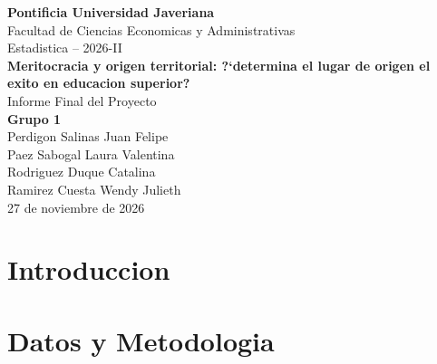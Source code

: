 \documentclass[11pt, a4paper]{article}
\begin{document}
\begin{center}
{\Large \textbf{Pontificia Universidad Javeriana}}\\[0.3cm]
Facultad de Ciencias Economicas y Administrativas\\[0.3cm]
Estadistica -- 2026-II\\[1cm]
{\LARGE \textbf{Meritocracia y origen territorial: ?`determina el lugar de origen el exito en educacion superior?}}\\[0.5cm]
{\large Informe Final del Proyecto}\\[1cm]
\textbf{Grupo 1}\\[0.3cm]
Perdigon Salinas Juan Felipe\\
Paez Sabogal Laura Valentina\\
Rodriguez Duque Catalina\\
Ramirez Cuesta Wendy Julieth\\[1cm]
27 de noviembre de 2026
\end{center}

\newpage
\tableofcontents
\newpage

\section{Introduccion}

\section{Datos y Metodologia}
\end{document}
